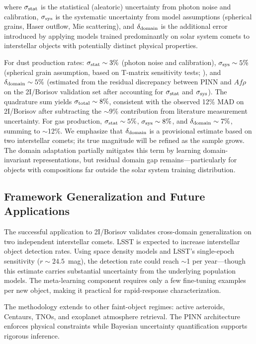 \documentclass[preprint2]{aastex631}
\begin{document}
where $\sigma_{\rm stat}$ is the statistical (aleatoric) uncertainty from photon noise and calibration, $\sigma_{\rm sys}$ is the systematic uncertainty from model assumptions (spherical grains, Haser outflow, Mie scattering), and $\delta_{\rm domain}$ is the additional error introduced by applying models trained predominantly on solar system comets to interstellar objects with potentially distinct physical properties.

For dust production rates: $\sigma_{\rm stat} \sim 3\%$ (photon noise and calibration), $\sigma_{\rm sys} \sim 5\%$ (spherical grain assumption, based on T-matrix sensitivity tests; \citealt{kolokolova04,shen11}), and $\delta_{\rm domain} \sim 5\%$ (estimated from the residual discrepancy between PINN and $Af\rho$ on the 2I/Borisov validation set after accounting for $\sigma_{\rm stat}$ and $\sigma_{\rm sys}$). The quadrature sum yields $\sigma_{\rm total} \sim 8\%$, consistent with the observed 12\% MAD on 2I/Borisov after subtracting the $\sim$9\% contribution from literature measurement uncertainty. For gas production, $\sigma_{\rm stat} \sim 5\%$, $\sigma_{\rm sys} \sim 8\%$, and $\delta_{\rm domain} \sim 7\%$, summing to $\sim$12\%. We emphasize that $\delta_{\rm domain}$ is a provisional estimate based on two interstellar comets; its true magnitude will be refined as the sample grows. The domain adaptation partially mitigates this term by learning domain-invariant representations, but residual domain gap remains---particularly for objects with compositions far outside the solar system training distribution.

\subsection{Framework Generalization and Future Applications}

The successful application to 2I/Borisov validates cross-domain generalization on two independent interstellar comets. LSST is expected to increase interstellar object detection rates. Using \citet{jones18} space density models and LSST's single-epoch sensitivity ($r \sim 24.5$~mag), the detection rate could reach $\sim$1 per year---though this estimate carries substantial uncertainty from the underlying population models. The meta-learning component requires only a few fine-tuning examples per new object, making it practical for rapid-response characterization.

The methodology extends to other faint-object regimes: active asteroids, Centaurs, TNOs, and exoplanet atmosphere retrieval. The PINN architecture enforces physical constraints while Bayesian uncertainty quantification supports rigorous inference.
\end{document}
